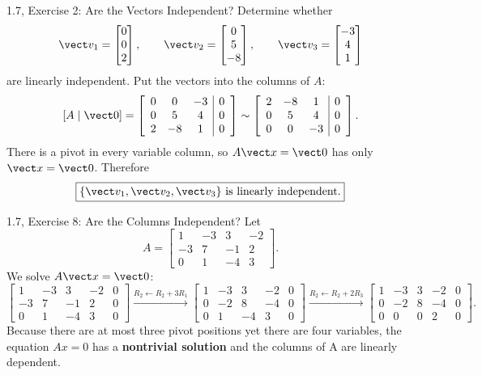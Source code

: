 \begin{frame}{1.7, Exercise 2: Are the Vectors Independent?}
Determine whether
\[
\vect v_1=\begin{bmatrix}0\\0\\2\end{bmatrix},
\qquad
\vect v_2=\begin{bmatrix}0\\5\\-8\end{bmatrix},
\qquad
\vect v_3=\begin{bmatrix}-3\\4\\1\end{bmatrix}
\]
are linearly independent. Put the vectors into the columns of $A$:
\[
\left[ A\mid\vect0\right]
=\left[\begin{array}{ccc|c}
0&0&-3&0\\0&5&4&0\\2&-8&1&0
\end{array}\right]
\sim
\left[\begin{array}{ccc|c}
2&-8&1&0\\0&5&4&0\\0&0&-3&0
\end{array}\right].
\]
\pause
There is a pivot in every variable column, so $A\vect x=\vect0$ has only
$\vect x=\vect0$. Therefore
\[
\boxed{\{\vect v_1,\vect v_2,\vect v_3\}\text{ is linearly independent}.}
\]
\end{frame}

\begin{frame}{1.7, Exercise 8: Are the Columns Independent?}
\footnotesize
Let
\[
A=\begin{bmatrix}
1&-3&3&-2\\
-3&7&-1&2\\
0&1&-4&3
\end{bmatrix}.
\]
We solve $A\vect x=\vect0$:
\[
\begin{bmatrix}
1&-3&3&-2&0\\-3&7&-1&2&0\\0&1&-4&3&0
\end{bmatrix}
\xrightarrow{R_2\leftarrow R_2+3R_1}
\begin{bmatrix}
1&-3&3&-2&0\\0&-2&8&-4&0\\0&1&-4&3&0
\end{bmatrix}
\xrightarrow{R_2\leftarrow R_2+2R_3}
\begin{bmatrix}
1&-3&3&-2&0\\0&-2&8&-4&0\\0&0&0&2&0
\end{bmatrix}.
\]
Because there are at most three pivot positions yet there are four variables, the equation $Ax =
0$ has a \textbf{nontrivial solution} and the columns of A are linearly dependent.
\end{frame}

